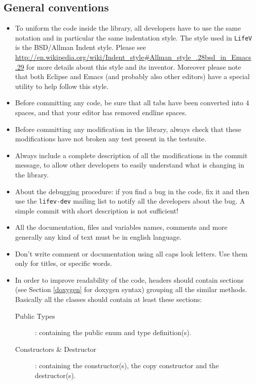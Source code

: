 \documentclass[a4paper]{article}
\begin{document}
\subsection{General conventions}
\begin{itemize}
  \item To uniform the code inside the library, all developers have to
  use the same notation and in particular the same indentation style. The style
  used in \texttt{LifeV} is the BSD/Allman Indent style. Please see
  \url{http://en.wikipedia.org/wiki/Indent_style#Allman_style_.28bsd_in_Emacs.29} 
  for more details about this style and its inventor.
  Moreover please note that both Eclipse and Emacs (and probably also other editors)
  have a special utility to help follow this style.
  \item Before committing any code, be sure that all tabs have been converted
  into $4$ spaces, and that your editor has removed endline spaces.
  \item Before committing any modification in the library, always check
  that these modifications have not broken any test present in the
  testsuite.
  \item Always include a complete description of all the modifications in the
  commit message, to allow other developers to easily understand what is
  changing in the library.
  \item About the debugging procedure: if you find a bug in the code, fix it
  and then use the \texttt{lifev-dev} mailing list to notify all the developers
  about the bug. A simple commit with short description is not sufficient!
  \item All the documentation, files and variables names, comments and more
  generally any kind of text must be in english language.
  \item Don't write comment or documentation using all caps look letters. Use
  them only for titles, or specific words.
  \item In order to improve readability of the code, headers should
  contain sections (see Section \ref{doxygen} for doxygen syntax) grouping
  all the similar methods. Basically all the classes should contain at least
  these sections:
  \begin{description}
      \item[Public Types]: containing the public enum and type definition(s).
	  \item[Constructors \& Destructor]: containing the constructor(s), the
      copy constructor and the destructor(s).

\end{description}
\end{itemize}
\end{document}
